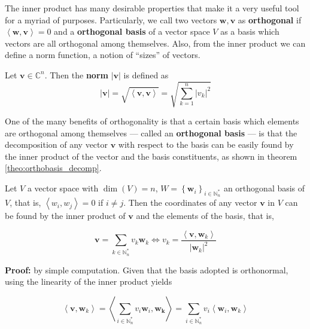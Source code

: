 	The inner product has many desirable properties that make it a very useful tool for a myriad of purposes. Particularly, we call two vectors $\mathbf{w,v}$ as \textbf{orthogonal} if $\left<\mathbf{w,v}\right> = 0$ and a \textbf{orthogonal basis} of a vector space $V$ as a basis which vectors are all orthogonal among themselves. Also, from the inner product we can define a norm function, a notion of ``sizes'' of vectors.

\begin{definition}\label{def:norm_complex} Let $\mathbf{v}\in\mathbb{C}^n$. Then the \textbf{norm} $\left\lvert \mathbf{v}\right\rvert$ is defined as 
\begin{equation} \left\lvert \mathbf{v}\right\rvert = \sqrt{\left<\mathbf{v,v}\right>}  = \sqrt{\sum_{k=1}^n \left\lvert v_k\right\rvert^2 }\end{equation}
\end{definition}

	One of the many benefits of orthogonality is that a certain basis which elements are orthogonal among themselves — called an \textbf{orthogonal basis} — is that the decomposition of any vector $\mathbf{v}$ with respect to the basis can be easily found by the inner product of the vector and the basis constituents, as shown in theorem \ref{theo:orthobasis_decomp}.

\begin{theorem}\label{theo:orthobasis_decomp} %
	Let $V$ a vector space with $\dim\left(V\right) = n$, $W = \left\{\mathbf{w}_i\right\}_{i\in\mathbb{N}_n^*}$ an orthogonal basis of $V$, that is, $\left<w_i,w_j\right> = 0$ if $i\neq j$. Then the coordinates of any vector $\mathbf{v}$ in $V$ can be found by the inner product of $\mathbf{v}$ and the elements of the basis, that is,

\begin{equation} \mathbf{v} = \sum_{k\in\mathbb{N}_n^*} v_k\mathbf{w}_k \Leftrightarrow v_k = \dfrac{\left<\mathbf{v},\mathbf{w}_k\right>}{\left\lvert\mathbf{w}_k \right\rvert^2} \end{equation}
\end{theorem}
\textbf{Proof:} by simple computation. Given that the basis adopted is orthonormal, using the linearity of the inner product yields

\begin{equation} \left<\mathbf{v},\mathbf{w}_k\right> = \left<\sum_{i\in\mathbb{N}_n^*} v_i\mathbf{w}_i,\mathbf{w_k}\right> = \sum_{i\in\mathbb{N}_n^*} v_i \left<\mathbf{w}_i,\mathbf{w}_k\right> \end{equation}

